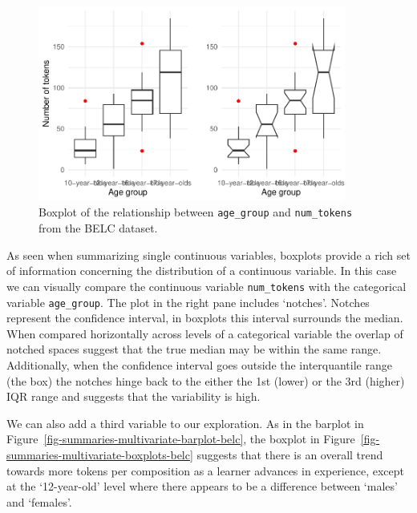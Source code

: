 \documentclass[
  letterpaper,
]{latex/krantz}
\begin{document}
\begin{figure}

{\centering \includegraphics[width=0.9\textwidth,height=\textheight]{./approaching-analysis_files/figure-pdf/fig-summaries-bivariate-boxplots-belc-1.pdf}

}

\caption{\label{fig-summaries-bivariate-boxplots-belc}Boxplot of the
relationship between \texttt{age\_group} and \texttt{num\_tokens} from
the BELC dataset.}

\end{figure}

As seen when summarizing single continuous variables, boxplots provide a
rich set of information concerning the distribution of a continuous
variable. In this case we can visually compare the continuous variable
\texttt{num\_tokens} with the categorical variable \texttt{age\_group}.
The plot in the right pane includes `notches'. Notches represent the
confidence interval, in boxplots this interval surrounds the median.
When compared horizontally across levels of a categorical variable the
overlap of notched spaces suggest that the true median may be within the
same range. Additionally, when the confidence interval goes outside the
interquantile range (the box) the notches hinge back to the either the
1st (lower) or the 3rd (higher) IQR range and suggests that the
variability is high.

We can also add a third variable to our exploration. As in the barplot
in Figure~\ref{fig-summaries-multivariate-barplot-belc}, the boxplot in
Figure~\ref{fig-summaries-multivariate-boxplots-belc} suggests that
there is an overall trend towards more tokens per composition as a
learner advances in experience, except at the `12-year-old' level where
there appears to be a difference between `males' and `females'.
\end{document}
